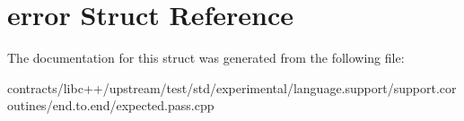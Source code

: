 \hypertarget{structerror}{}\section{error Struct Reference}
\label{structerror}


The documentation for this struct was generated from the following file\+:\begin{DoxyCompactItemize}
\item 
contracts/libc++/upstream/test/std/experimental/language.\+support/support.\+coroutines/end.\+to.\+end/expected.\+pass.\+cpp\end{DoxyCompactItemize}

